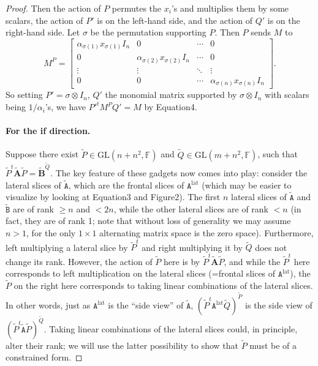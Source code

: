 \begin{proof}
Then the action of $P$ permutes the $x_i$'s and multiplies them by some scalars, the action of $P'$ is on the left-hand side, and the action of $Q'$ is on the right-hand side. Let $\sigma$ be the permutation supporting $P$. Then $P$ sends $M$ to
\[M^P=\begin{bmatrix}\alpha_{\sigma(1)}x_{\sigma(1)}I_n&0&\cdots&0\\0&\alpha_{\sigma(2)}x_{\sigma(2)}I_n&\cdots&0\\\vdots&\vdots&\ddots&\vdots\\0&0&\cdots&\alpha_{\sigma(n)}x_{\sigma(n)}I_n\end{bmatrix}.\]
So setting $P'=\sigma\otimes I_n$, $Q'$ the monomial matrix supported by $\sigma\otimes I_n$ with scalars being $1/\alpha_i$'s, we have $P'^tM^PQ'=M$ by Equation4.
\paragraph{For the if direction.}
Suppose there exist $\widetilde P\in\mathrm{GL}(n+n^2,\mathbb F)$ and $\widetilde Q\in\mathrm{GL}(m+n^2,\mathbb F)$, such that $\widetilde P^t\widetilde{\mathbf A}\widetilde P=\widetilde{\mathbf B}^{\widetilde Q}$. The key feature of these gadgets now comes into play: consider the lateral slices of $\widetilde{\mathtt A}$, which are the frontal slices of $\mathtt A^{\mathrm{lat}}$ (which may be easier to visualize by looking at Equation3 and Figure2). The first $n$ lateral slices of $\widetilde{\mathtt A}$ and $\widetilde{\mathtt B}$ are of rank $\ge n$ and $<2n$, while the other lateral slices are of rank $<n$ (in fact, they are of rank 1; note that without loss of generality we may assume $n>1$, for the only $1\times1$ alternating matrix space is the zero space). Furthermore, left multiplying a lateral slice by $\widetilde P^t$ and right multiplying it by $\widetilde Q$ does not change its rank. However, the action of $\widetilde P$ here is by $\widetilde P^t\widetilde{\mathbf A}\widetilde P$, and while the $\widetilde P^t$ here corresponds to left multiplication on the lateral slices (=frontal slices of $\mathtt A^{\mathrm{lat}}$), the $\widetilde P$ on the right here corresponds to taking linear combinations of the lateral slices. In other words, just as $\mathtt A^{\mathrm{lat}}$ is the ``side view'' of $\widetilde{\mathtt A}$, $(\widetilde P^t\mathtt A^{\mathrm{lat}}\widetilde Q)^{\widetilde P}$ is the side view of $(\widetilde P^t\widetilde{\mathtt A}\widetilde P)^{\widetilde Q}$. Taking linear combinations of the lateral slices could, in principle, alter their rank; we will use the latter possibility to show that $\widetilde P$ must be of a constrained form.

\end{proof}
